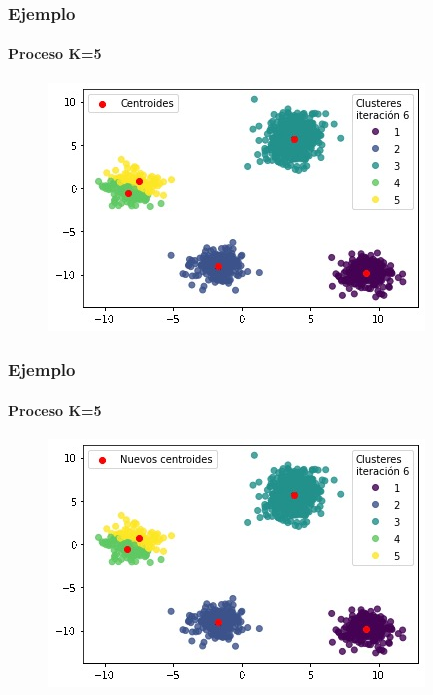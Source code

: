 \documentclass[
  shownotes,
  xcolor={svgnames},
  hyperref={colorlinks,citecolor=DarkBlue,linkcolor=DarkRed,urlcolor=DarkBlue}
  , aspectratio=169]{beamer}
\begin{document}
\begin{frame}
\frametitle{Ejemplo}
\framesubtitle{Proceso K=5}


\begin{figure}[H] \centering

    \centering
    \includegraphics[scale=.7]{figures/k5_9.jpg}
  \\
  \tiny
\end{figure}


\end{frame}
\begin{frame}
\frametitle{Ejemplo}
\framesubtitle{Proceso K=5}


\begin{figure}[H] \centering

    \centering
    \includegraphics[scale=.7]{figures/k5_10.jpg}
  \\
  \tiny
\end{figure}


\end{frame}
\end{document}
